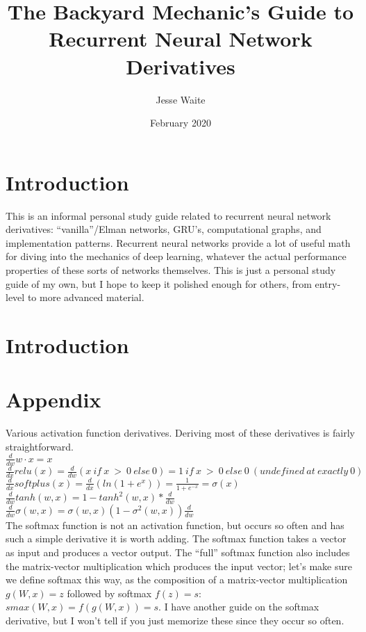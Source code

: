 \documentclass{article}
\title{The Backyard Mechanic's Guide to Recurrent Neural Network Derivatives}
\author{Jesse Waite}
\date{February 2020}
\begin{document}
\maketitle

\section{Introduction}
This is an informal personal study guide related to recurrent neural network derivatives: ``vanilla''/Elman networks, GRU's, computational graphs, and implementation patterns. Recurrent neural networks provide a lot of useful math for diving into the mechanics of deep learning, whatever the actual performance properties of these sorts of networks themselves. This is just a personal study guide of my own, but I hope to keep it polished enough for others, from entry-level to more advanced material.

\section{Introduction}

\section{Appendix}

Various activation function derivatives. Deriving most of these derivatives is fairly straightforward. \\

$\frac{d}{dw} w \cdot x = x$ \\

$\frac{d}{dx} relu(x) =\frac{d}{dw} (x\ if\ x\ >\ 0\ else\ 0) = 1\ if\ x\ >\ 0\ else\ 0\ (undefined\ at\ exactly\ 0)$ \\

$\frac{d}{dx} softplus(x) = \frac{d}{dx}(ln(1 + e^{x})) = \frac{1}{1 + e^{-x}} = \sigma(x) $ \\

$\frac{d}{dw} tanh(w,x) = 1 - tanh^2(w,x) * \frac{d}{dw}$ \\

$\frac{d}{dw} \sigma(w,x) = \sigma(w,x)(1 - \sigma^{2}(w,x)) \frac{d}{dw}$ \\

The softmax function is not an activation function, but occurs so often and has such a simple derivative it is worth adding. The softmax function takes a vector as input and produces a vector output. The ``full'' softmax function also includes the matrix-vector multiplication which produces the input vector; let's make sure we define softmax this way, as the composition of a matrix-vector multiplication $g(W,x) = z$ followed by softmax $f(z) = s$: $smax(W,x) = f(g(W,x)) = s$. I have another guide on the softmax derivative, but I won't tell if you just memorize these since they occur so often.
\end{document}
